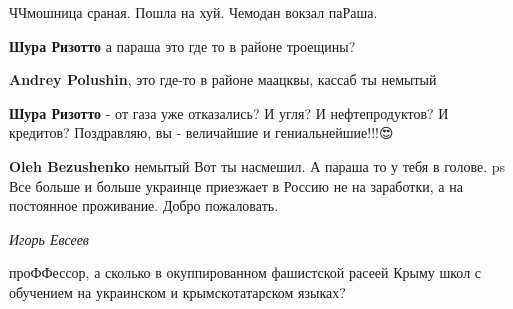 \begin{itemize}


ЧЧмошница сраная. Пошла на хуй. Чемодан вокзал паРаша.

\begin{itemize}

\textbf{Шура Ризотто} а параша это где то в районе троещины?


\textbf{Andrey Polushin}, это где-то в районе маацквы, кассаб ты немытый


\textbf{Шура Ризотто} - от газа уже отказались? И угля? И нефтепродуктов? И кредитов? Поздравляю, вы - величайшие и гениальнейшие!!!😍


\textbf{Oleh Bezushenko} немытый \Smiley[1.0][yellow] Вот ты насмешил. А параша то у тебя в голове.
ps Все больше и больше украинце приезжает в Россию не на заработки, а на постоянное проживание. Добро пожаловать.
\end{itemize}

\emph{Игорь Евсеев}

проФФессор, а сколько в окуппированном фашистской расеей Крыму школ с обучением
на украинском и крымскотатарском языках?

\end{itemize}

